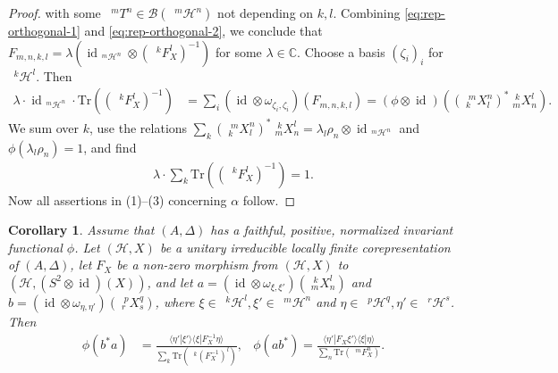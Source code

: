 \documentclass[12pt]{article}
\theoremstyle{change}
\DeclareMathOperator{\id}{id}
\newcommand{\C}{\mathbb{C}}
\newcommand{\Tr}{\mathrm{Tr}}
\newcommand{\Gr}[5]{\;{}^{\;#2}_{#4}#1_{#5}^{#3}}%
\newcommand{\Gru}[3]{\;{}^{\;#2}#1^{#3}}
\newtheorem{Cor}[Theorem]{Corollary}
\theoremstyle{definition}
\numberwithin{equation}{section}
\begin{document}
\begin{proof}
  with some $\Gru{T}{m}{n} \in \mathcal{B}(\Gru{\mathcal{H}}{m}{n})$
  not depending on $k,l$. Combining \eqref{eq:rep-orthogonal-1} and
  \eqref{eq:rep-orthogonal-2}, we conclude that $F_{m,n,k,l} = \lambda
  (\id_{\Gru{\mathcal{H}}{m}{n}} \otimes (\Gru{F_{X}}{k}{l})^{-1})$
  for some $\lambda \in \C$.  Choose a basis
  $(\zeta_{i})_{i}$ for $\Gru{\mathcal{H}}{k}{l}$. Then
  \begin{align*}
    \lambda \cdot \id_{\Gru{\mathcal{H}}{m}{n}} \cdot
    \Tr((\Gru{F_{X}}{k}{l})^{-1}) &= \sum_{i} (\id \otimes
    \omega_{\zeta_{i},\zeta_{i}})(F_{m,n,k,l}) = (\phi \otimes
    \id)((\Gr{X}{m}{n}{k}{l})^{*} \Gr{X}{k}{l}{m}{n}).
  \end{align*}
  We sum over $k$, use the relations $\sum_{k}
  (\Gr{X}{m}{n}{k}{l})^{*} \Gr{X}{k}{l}{m}{n} = \lambda_{l}\rho_{n}
  \otimes \id_{\Gru{\mathcal{H}}{m}{n}}$ and
  $\phi(\lambda_{l}\rho_{n})=1$, and find
\begin{align*}
\lambda \cdot  \sum_{k} \Tr((\Gru{F_{X}}{k}{l})^{-1}) = 1.
\end{align*}
Now all assertions in (1)--(3) concerning $\alpha$ follow.
\end{proof}
\begin{Cor}
  Assume that $(A,\Delta)$ has a faithful, positive, normalized
  invariant functional $\phi$. Let $(\mathcal{H},X)$ be a unitary
  irreducible locally finite corepresentation of $(A,\Delta)$, let
  $F_{X}$ be a non-zero morphism from $(\mathcal{H},X)$ to
  $(\mathcal{H},(S^{2} \otimes \id)(X))$, and let $a=(\id \otimes
  \omega_{\xi,\xi'})(\Gr{X}{k}{l}{m}{n})$ and $b=(\id \otimes
  \omega_{\eta,\eta'})(\Gr{X}{p}{q}{r}{s})$, where $\xi \in
  \Gru{\mathcal{H}}{k}{l}, \xi' \in \Gru{\mathcal{H}}{m}{n}$ and $\eta
  \in \Gru{\mathcal{H}}{p}{q}, \eta' \in \Gru{\mathcal{H}}{r}{s}$.
  Then
\begin{align*}
  \phi(b^{*}a) &= \frac{\langle \eta'|\xi'\rangle \langle
    \xi|F^{-1}_{X}\eta\rangle}{\sum_{k}
    \Tr(\Gru{(F^{-1}_{X})}{k}{l})}, & \phi(ab^{*}) = \frac{\langle
    \eta'|F_{X}\xi'\rangle \langle \xi|\eta\rangle}{\sum_{n}
    \Tr(\Gru{F_{X}}{m}{n})}.
\end{align*}
\end{Cor}
\end{document}
